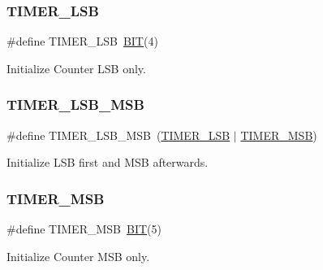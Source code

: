 \hypertarget{group__i8254_gac18cb814ebd0d67235392c330e0e3504}{}\label{group__i8254_gac18cb814ebd0d67235392c330e0e3504} 
\subsubsection{\texorpdfstring{T\+I\+M\+E\+R\+\_\+\+L\+SB}{TIMER\_LSB}}
{\footnotesize\ttfamily \#define T\+I\+M\+E\+R\+\_\+\+L\+SB~\hyperlink{video__gr_8c_a3a8ea58898cb58fc96013383d39f482c}{B\+IT}(4)}



Initialize Counter L\+SB only. 

\hypertarget{group__i8254_ga8c0f1933323274c765e23837e4fbc8c7}{}\label{group__i8254_ga8c0f1933323274c765e23837e4fbc8c7} 
\subsubsection{\texorpdfstring{T\+I\+M\+E\+R\+\_\+\+L\+S\+B\+\_\+\+M\+SB}{TIMER\_LSB\_MSB}}
{\footnotesize\ttfamily \#define T\+I\+M\+E\+R\+\_\+\+L\+S\+B\+\_\+\+M\+SB~(\hyperlink{group__i8254_gac18cb814ebd0d67235392c330e0e3504}{T\+I\+M\+E\+R\+\_\+\+L\+SB} $\vert$ \hyperlink{group__i8254_ga2a8a6d363c612d756cd8d78480f7cd04}{T\+I\+M\+E\+R\+\_\+\+M\+SB})}



Initialize L\+SB first and M\+SB afterwards. 

\hypertarget{group__i8254_ga2a8a6d363c612d756cd8d78480f7cd04}{}\label{group__i8254_ga2a8a6d363c612d756cd8d78480f7cd04} 
\subsubsection{\texorpdfstring{T\+I\+M\+E\+R\+\_\+\+M\+SB}{TIMER\_MSB}}
{\footnotesize\ttfamily \#define T\+I\+M\+E\+R\+\_\+\+M\+SB~\hyperlink{video__gr_8c_a3a8ea58898cb58fc96013383d39f482c}{B\+IT}(5)}



Initialize Counter M\+SB only. 

